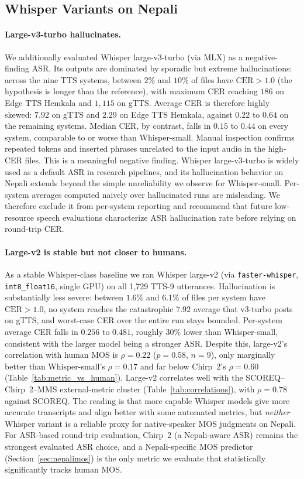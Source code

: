 \documentclass[11pt]{article}
\begin{document}
\subsection{Whisper Variants on Nepali}
\label{sec:whisper-large}

\paragraph{Large-v3-turbo hallucinates.} We additionally evaluated Whisper large-v3-turbo (via MLX) as a negative-finding ASR. Its outputs are dominated by sporadic but extreme hallucinations: across the nine TTS systems, between $2\%$ and $10\%$ of files have $\text{CER} > 1.0$ (the hypothesis is longer than the reference), with maximum CER reaching $186$ on Edge TTS Hemkala and $1{,}115$ on gTTS. Average CER is therefore highly skewed: $7.92$ on gTTS and $2.29$ on Edge TTS Hemkala, against $0.22$ to $0.64$ on the remaining systems. Median CER, by contrast, falls in $0.15$ to $0.44$ on every system, comparable to or worse than Whisper-small. Manual inspection confirms repeated tokens and inserted phrases unrelated to the input audio in the high-CER files. This is a meaningful negative finding. Whisper large-v3-turbo is widely used as a default ASR in research pipelines, and its hallucination behavior on Nepali extends beyond the simple unreliability we observe for Whisper-small. Per-system averages computed naively over hallucinated runs are misleading. We therefore exclude it from per-system reporting and recommend that future low-resource speech evaluations characterize ASR hallucination rate before relying on round-trip CER.

\paragraph{Large-v2 is stable but not closer to humans.} As a stable Whisper-class baseline we ran Whisper large-v2 (via \texttt{faster-whisper}, \texttt{int8\_float16}, single GPU) on all 1{,}729 TTS-9 utterances. Hallucination is substantially less severe: between $1.6\%$ and $6.1\%$ of files per system have $\text{CER} > 1.0$, no system reaches the catastrophic $7.92$ average that v3-turbo posts on gTTS, and worst-case CER over the entire run stays bounded. Per-system average CER falls in $0.256$ to $0.481$, roughly $30\%$ lower than Whisper-small, consistent with the larger model being a stronger ASR. Despite this, large-v2's correlation with human MOS is $\rho = 0.22$ ($p = 0.58$, $n = 9$), only marginally better than Whisper-small's $\rho = 0.17$ and far below Chirp~2's $\rho = 0.60$ (Table~\ref{tab:metric_vs_human}). Large-v2 correlates well with the SCOREQ--Chirp~2--MMS external-metric cluster (Table~\ref{tab:correlations}), with $\rho = 0.78$ against SCOREQ. The reading is that more capable Whisper models give more accurate transcripts and align better with some automated metrics, but \emph{neither} Whisper variant is a reliable proxy for native-speaker MOS judgments on Nepali. For ASR-based round-trip evaluation, Chirp~2 (a Nepali-aware ASR) remains the strongest evaluated ASR choice, and a Nepali-specific MOS predictor (Section~\ref{sec:nepalimos}) is the only metric we evaluate that statistically significantly tracks human MOS.
\end{document}
